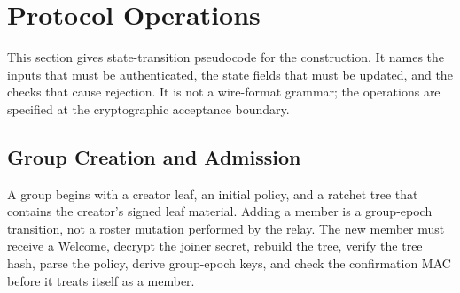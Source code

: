 \documentclass[preprint,12pt]{elsarticle}
\theoremstyle{definition}
\begin{document}
\section{Protocol Operations}\label{sec:operations}

This section gives state-transition pseudocode for the construction. It names
the inputs that must be authenticated, the state fields that must be updated,
and the checks that cause rejection. It is not a wire-format grammar; the
operations are specified at the cryptographic acceptance boundary.

\subsection{Group Creation and Admission}

A group begins with a creator leaf, an initial policy, and a ratchet tree that
contains the creator's signed leaf material. Adding a member is a group-epoch
transition, not a roster mutation performed by the relay. The new member must
receive a Welcome, decrypt the joiner secret, rebuild the tree, verify the
tree hash, parse the policy, derive group-epoch keys, and check the confirmation MAC
before it treats itself as a member.
\end{document}
